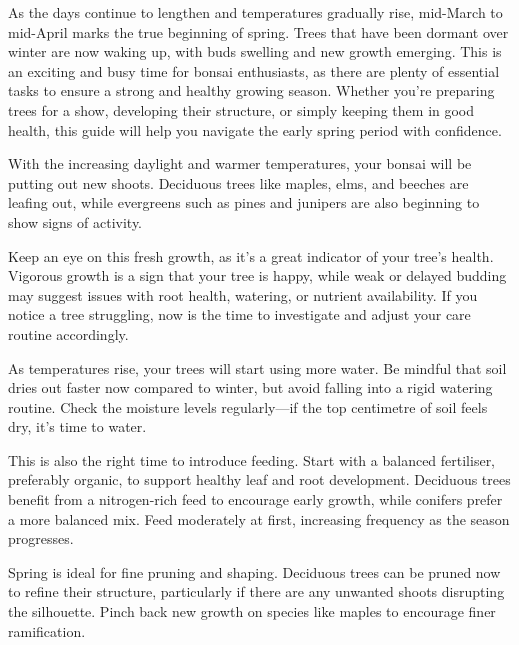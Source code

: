 \label{2025-03-care}
\noindent
As the days continue to lengthen and temperatures gradually rise, mid\--March to mid\--April marks the true beginning of spring. 
Trees that have been dormant over winter are now waking up, with buds swelling and new growth emerging. 
This is an exciting and busy time for bonsai enthusiasts, as there are plenty of essential tasks to ensure a strong and healthy growing season. 
Whether you're preparing trees for a show, developing their structure, or simply keeping them in good health, this guide will help you navigate the early spring period with confidence.

\medskip

\noindent
With the increasing daylight and warmer temperatures, your bonsai will be putting out new shoots. 
Deciduous trees like maples, elms, and beeches are leafing out, while evergreens such as pines and junipers are also beginning to show signs of activity. 

Keep an eye on this fresh growth, as it's a great indicator of your tree's health. 
Vigorous growth is a sign that your tree is happy, while weak or delayed budding may suggest issues with root health, watering, or nutrient availability. 
If you notice a tree struggling, now is the time to investigate and adjust your care routine accordingly.

\medskip

\noindent
As temperatures rise, your trees will start using more water. 
Be mindful that soil dries out faster now compared to winter, but avoid falling into a rigid watering routine. 
Check the moisture levels regularly---if the top centimetre of soil feels dry, it's time to water. 

This is also the right time to introduce feeding.
Start with a balanced fertiliser, preferably organic, to support healthy leaf and root development.
Deciduous trees benefit from a nitrogen\--rich feed to encourage early growth, while conifers prefer a more balanced mix.
Feed moderately at first, increasing frequency as the season progresses.

\medskip

\noindent
Spring is ideal for fine pruning and shaping.
Deciduous trees can be pruned now to refine their structure, particularly if there are any unwanted shoots disrupting the silhouette.
Pinch back new growth on species like maples to encourage finer ramification.


